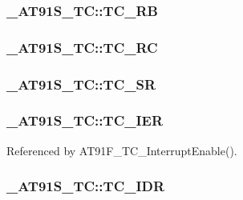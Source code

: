 \hypertarget{struct__AT91S__TC_0ae10f9a6d3695b17618f62d254c2f20}{
\subsubsection{ {\bf \_\-AT91S\_\-TC::TC\_\-RB}}}
\label{struct__AT91S__TC_0ae10f9a6d3695b17618f62d254c2f20}


\hypertarget{struct__AT91S__TC_df8a3862cc1c6e10f09b682e36dcac2a}{
\subsubsection{ {\bf \_\-AT91S\_\-TC::TC\_\-RC}}}
\label{struct__AT91S__TC_df8a3862cc1c6e10f09b682e36dcac2a}


\hypertarget{struct__AT91S__TC_530883d094b52082a5d1fdd12e143eb2}{
\subsubsection{ {\bf \_\-AT91S\_\-TC::TC\_\-SR}}}
\label{struct__AT91S__TC_530883d094b52082a5d1fdd12e143eb2}


\hypertarget{struct__AT91S__TC_208e358e5e40be90d09f42cf90683b19}{
\subsubsection{ {\bf \_\-AT91S\_\-TC::TC\_\-IER}}}
\label{struct__AT91S__TC_208e358e5e40be90d09f42cf90683b19}




Referenced by AT91F\_\-TC\_\-InterruptEnable().\hypertarget{struct__AT91S__TC_72c562420749d9b31f6b6eb9e76af529}{
\subsubsection{ {\bf \_\-AT91S\_\-TC::TC\_\-IDR}}}
\label{struct__AT91S__TC_72c562420749d9b31f6b6eb9e76af529}





